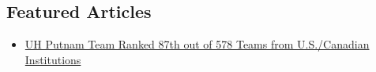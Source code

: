 \documentclass[margin,line]{res}
\begin{document}
\begin{resume}
\section{\sc Featured Articles}
\begin{itemize}
    \item[] \href{http://www.uh.edu/nsm/math/news-events/stories/2013_2014/0916_putnamGroup.php}{UH Putnam Team Ranked 87th out of 578 Teams from U.S./Canadian Institutions}
\end{itemize}

\end{resume}
\end{document}
